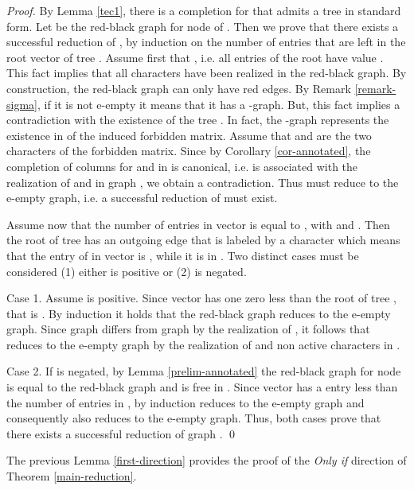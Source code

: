 \documentclass{llncs}
\begin{document}
\begin{proof}

By Lemma \ref{tec1},   there is a  completion  for  that  admits  a tree  in standard form.
Let  be the red-black graph for  node  of . 
  Then we prove that there exists a successful reduction of , by 
 induction on the number  of   entries that are left in the root vector   of tree .
Assume first that , i.e. all entries of the root have value .  This fact implies that all characters have been realized in the red-black graph. By construction, the red-black graph can only have red edges.  By Remark \ref{remark-sigma},  if it is not e-empty it means that it has a -graph. But, this fact implies  a contradiction with the existence of the tree . In fact, the -graph represents the existence in  of the induced forbidden matrix. Assume that  and  are the two characters of the forbidden matrix. Since by Corollary \ref{cor-annotated}, the completion of columns for  and  in  is canonical, i.e. is associated with the realization of  and  in graph ,  we obtain a contradiction. Thus  must reduce to the e-empty graph, i.e. a successful reduction of  must exist.

Assume now that the number of entries  in vector  is equal to , with  and . Then the root   of tree  has an outgoing edge  that is labeled by a character  which means that the entry of  in vector  is , while it is  in . Two distinct cases must be considered (1) either  is positive or (2)  is negated.


Case 1.  Assume  is positive.
Since  vector  has one zero less than the root of tree , that is . By  induction  it holds that the red-black graph  reduces to the e-empty graph. Since graph  differs from graph  by the realization of , it follows  that  reduces to the e-empty graph by the realization of  and non active characters in .


Case 2. If  is negated, by Lemma \ref{prelim-annotated}  the red-black graph  for node  is equal to the  red-black graph  and  is free in .  Since vector  has a  entry less than  the number of  entries in  , by induction  reduces to the e-empty graph and consequently also  reduces to the e-empty graph. Thus, both cases prove that there exists a successful reduction of  graph .
\qed

\end{proof}


The previous Lemma \ref{first-direction} provides the proof of the {\em Only if} direction of Theorem \ref{main-reduction}.
\end{document}
